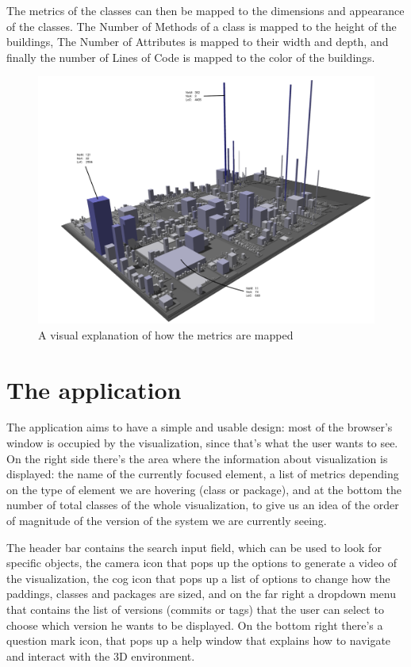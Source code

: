 \documentclass[]{usiinfbachelorproject}
\begin{document}
The metrics of the classes can then be mapped to the dimensions and appearance of the classes.
The Number of Methods of a class is mapped to the height of the buildings, The Number of Attributes is mapped to their width and depth, and finally the number of Lines of Code is mapped to the color of the buildings.

\begin{figure} [H]
\centering
\includegraphics[width=1\textwidth]{pictures/metrics.png}
\caption{A visual explanation of how the metrics are mapped}
\label{fig:metrics}
\end{figure}



\section{The application} \label{The application}

The application aims to have a simple and usable design: most of the browser's window is occupied by the visualization, since that's what the user wants to see. On the right side there's the area where the information about visualization is displayed: the name of the currently focused element, a list of metrics depending on the type of element we are hovering (class or package),
and at the bottom the number of total classes of the whole visualization, to give us an idea of the order of magnitude of the version of the system we are currently seeing.

The header bar contains the search input field, which can be used to look for specific objects, the camera icon that pops up the options to generate a video of the visualization, the cog icon that pops up a list of options to change how the paddings, classes and packages are sized, and on the far right a dropdown menu that contains the list of versions (commits or tags) that the user can select to choose which version he wants to be displayed.
On the bottom right there's a question mark icon, that pops up a help window that explains how to navigate and interact with the 3D environment.
\end{document}
